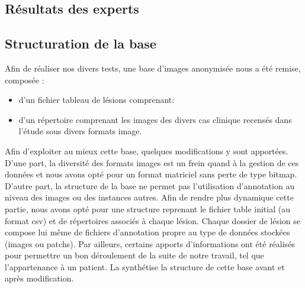 \subsection{Résultats des experts}

\subsection{Structuration de la base}
Afin de réaliser nos divers tests, une base d'images anonymisée nous a été remise, composée :
\begin{itemize}
\item d'un fichier tableau de lésions comprenant:
    \item d'un répertoire comprenant les images des divers cas clinique recensés dans l'étude sous divers formats image.
\end{itemize}\par

Afin d'exploiter au mieux cette base, quelques modifications y sont apportées. D'une part, la diversité des formats images est un frein quand à la gestion de ces données et nous avons opté pour un format matriciel sans perte de type bitmap. D'autre part, la structure de la base ne permet pas l'utilisation d'annotation au niveau des images ou des instances autres. Afin de rendre plus dynamique cette partie, nous avons opté pour une structure reprenant le fichier table initial (au format \gls{csv}) et de répertoires associés à chaque lésion. Chaque dossier de lésion se compose lui même de fichiers d'annotation propre au type de données stockées (images ou patchs). Par ailleurs, certains apports d'informations ont été réalisés pour permettre un bon déroulement de la suite de notre travail, tel que l'appartenance à un patient. La  synthétise la structure de cette base avant et après modification.\par

